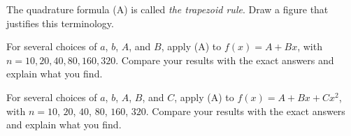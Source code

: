 \begin{exerciselist}
\begin{alist}
    \item %
    The quadrature formula (A) is called {\color{blue}\it the trapezoid rule}. Draw a figure that
    justifies this terminology.

    \item %
    \Lex For several choices of $a$, $b$, $A$, and $B$, apply (A) to $f(x)=A+Bx$, with
    $n=10,20,40,80,160,320$. Compare your results with the exact answers and explain what you find.

    \item %
    \Lex For several choices of $a$, $b$, $A$, $B$, and $C$, apply (A) to $f(x)=A+Bx+Cx^{2}$, with
    $n=10$, $20$, $40$, $80$, $160$, $320$. Compare your results with the exact answers and explain
    what you find.
  \end{alist}
\end{exerciselist}
